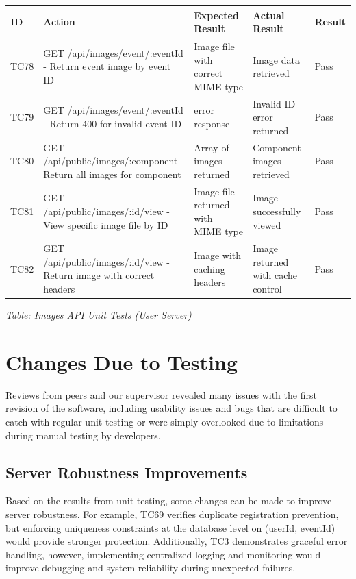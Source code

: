 \documentclass[12pt, titlepage]{article}
\begin{document}
\noindent
\begin{longtable}{|>{\raggedright\arraybackslash}p{1cm}|>{\raggedright\arraybackslash}p{4.5cm}|>{\raggedright\arraybackslash}p{3.5cm}|>{\raggedright\arraybackslash}p{3.5cm}|>{\raggedright\arraybackslash}p{1.5cm}|}
\hline
\textbf{ID} & \textbf{Action} & \textbf{Expected Result} & \textbf{Actual Result} & \textbf{Result} \\\hline
\endhead
\hline
TC78 & GET /api/images/event/:eventId - Return event image by event ID & Image file with correct MIME type & Image data retrieved & \cellcolor{green!30}Pass \\
\hline
TC79 & GET /api/images/event/:eventId - Return 400 for invalid event ID & 400 error response & Invalid ID error returned & \cellcolor{green!30}Pass \\
\hline
TC80 & GET /api/public/images/:component - Return all images for component & Array of images returned & Component images retrieved & \cellcolor{green!30}Pass \\
\hline
TC81 & GET /api/public/images/:id/view - View specific image file by ID & Image file returned with MIME type & Image successfully viewed & \cellcolor{green!30}Pass \\
\hline
TC82 & GET /api/public/images/:id/view - Return image with correct headers & Image with caching headers & Image returned with cache control & \cellcolor{green!30}Pass \\
\hline
\end{longtable}

\vspace{0.5cm}

{\small \textit{Table: Images API Unit Tests (User Server)}}

\section{Changes Due to Testing}

Reviews from peers and our supervisor revealed many issues with the first revision of the software, including usability issues and bugs that are difficult to catch with regular unit testing or were simply overlooked due to limitations during manual testing by developers.

\subsection{Server Robustness Improvements}

Based on the results from unit testing, some changes can be made to improve server robustness. For example, TC69 verifies duplicate registration prevention, but enforcing uniqueness constraints at the database level on (userId, eventId) would provide stronger protection. Additionally, TC3 demonstrates graceful error handling, however, implementing centralized logging and monitoring would improve debugging and system reliability during unexpected failures.
\end{document}
